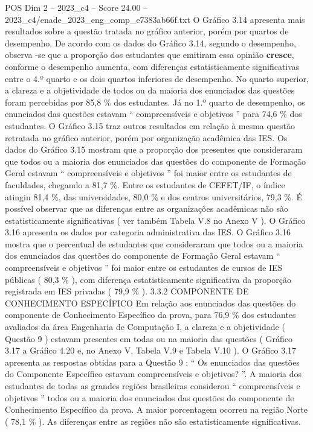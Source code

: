 \begin{textsample}{POS Dim 2 – 2023\_c4 – Score 24.00 – 2023\_c4/enade\_2023\_eng\_comp\_e7383ab66f.txt}
O Gráfico 3.14 apresenta mais resultados sobre a questão tratada no gráfico anterior, porém por quartos de desempenho.
De acordo com os dados do Gráfico 3.14, segundo o desempenho, observa -se que a proporção dos estudantes que emitiram essa opinião \textbf{cresce}, conforme o desempenho aumenta, com diferenças estatisticamente significativas entre o 4.º quarto e os dois quartos inferiores de desempenho.
No quarto superior, a clareza e a objetividade de todos ou da maioria dos enunciados das questões foram percebidas por 85,8 \% dos estudantes.
Já no 1.º quarto de desempenho, os enunciados das questões estavam “ compreensíveis e objetivos ” para 74,6 \% dos estudantes.
O Gráfico 3.15 traz outros resultados em relação à mesma questão retratada no gráfico anterior, porém por organização acadêmica das IES.
Os dados do Gráfico 3.15 mostram que a proporção dos presentes que consideraram que todos ou a maioria dos enunciados das questões do componente de Formação Geral estavam “ compreensíveis e objetivos ” foi maior entre os estudantes de faculdades, chegando a 81,7 \%.
Entre os estudantes de CEFET/IF, o índice atingiu 81,4 \%, das universidades, 80,0 \% e dos centros universitários, 79,3 \%.
É possível observar que as diferenças entre as organizações acadêmicas não são estatisticamente significativas ( ver também Tabela V.8 no Anexo V ).
O Gráfico 3.16 apresenta os dados por categoria administrativa das IES.
O Gráfico 3.16 mostra que o percentual de estudantes que consideraram que todos ou a maioria dos enunciados das questões do componente de Formação Geral estavam “ compreensíveis e objetivos ” foi maior entre os estudantes de cursos de IES públicas ( 80,3 \% ), com diferença estatisticamente significativa da proporção registrada em IES privadas ( 79,9 \% ). 3.3.2 COMPONENTE DE CONHECIMENTO ESPECÍFICO Em relação aos enunciados das questões do componente de Conhecimento Específico da prova, para 76,9 \% dos estudantes avaliados da área Engenharia de Computação I, a clareza e a objetividade ( Questão 9 ) estavam presentes em todas ou na maioria das questões ( Gráfico 3.17 a Gráfico 4.20 e, no Anexo V, Tabela V.9 e Tabela V.10 ).
O Gráfico 3.17 apresenta as respostas obtidas para a Questão 9 : “ Os enunciados das questões do Componente Específico estavam compreensíveis e objetivos? ”.
A maioria dos estudantes de todas as grandes regiões brasileiras considerou “ compreensíveis e objetivos ” todos ou a maioria dos enunciados das questões do componente de Conhecimento Específico da prova.
A maior porcentagem ocorreu na região Norte ( 78,1 \% ).
As diferenças entre as regiões não são estatisticamente significativas.

\end{textsample}
